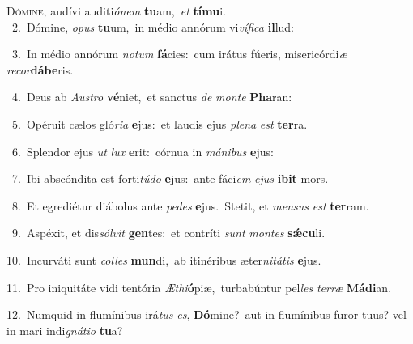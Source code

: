 \lettrine{\initial\textcolor{\initialcolor}{D}}{ómine,} audívi auditi\-\textit{ó}\-\textit{nem} \textbf{tu}\-am,~\star \textit{et} \textbf{tí}\-\textbf{mu}i.\\
{\numbfont\textcolor{\numbcolor}{~2.}}~Dómine, \textit{o}\-\textit{pus} \textbf{tu}\-um,~\star in médio annórum vi\-\textit{ví}\-\textit{fi}\textit{ca} \textbf{il}\-lud:\par
{\numbfont\textcolor{\numbcolor}{~3.}}~In médio annórum \textit{no}\-\textit{tum} \textbf{fá}\-cies:~\star cum irátus fúeris, misericórdi\textit{æ} \textit{re}\-\textit{cor}\textbf{dá}\textbf{be}ris.\par
{\numbfont\textcolor{\numbcolor}{~4.}}~Deus ab \textit{Aus}\-\textit{tro} \textbf{vé}\-niet,~\star et sanctus \textit{de} \textit{mon}\-\textit{te} \textbf{Pha}\-ran:\par
{\numbfont\textcolor{\numbcolor}{~5.}}~Opéruit cælos gló\-\textit{ri}\-\textit{a} \textbf{e}\-jus:~\star et laudis ejus \textit{ple}\-\textit{na} \textit{est} \textbf{ter}\-ra.\par
{\numbfont\textcolor{\numbcolor}{~6.}}~Splendor ejus \textit{ut} \textit{lux} \textbf{e}\-rit:~\star córnua in \textit{má}\-\textit{ni}\textit{bus} \textbf{e}\-jus:\par
{\numbfont\textcolor{\numbcolor}{~7.}}~Ibi abscóndita est forti\-\textit{tú}\-\textit{do} \textbf{e}\-jus:~\star ante fáci\textit{em} \textit{e}\-\textit{jus} \textbf{i}\-\textbf{bit} mors.\par
{\numbfont\textcolor{\numbcolor}{~8.}}~Et egrediétur diábolus ante \textit{pe}\-\textit{des} \textbf{e}\-jus.~\star Stetit, et \textit{men}\-\textit{sus} \textit{est} \textbf{ter}\-ram.\par
{\numbfont\textcolor{\numbcolor}{~9.}}~Aspéxit, et dis\-\textit{sól}\-\textit{vit} \textbf{gen}\-tes:~\star et contríti \textit{sunt} \textit{mon}\-\textit{tes} \textbf{sǽ}\-\textbf{cu}li.\par
{\numbfont\textcolor{\numbcolor}{10.}}~Incurváti sunt \textit{col}\-\textit{les} \textbf{mun}\-di,~\star ab itinéribus æter\-\textit{ni}\-\textit{tá}\textit{tis} \textbf{e}\-jus.\par
{\numbfont\textcolor{\numbcolor}{11.}}~Pro iniquitáte vidi tentória \textit{Æ}\-\textit{thi}\textbf{ó}piæ,~\star turbabúntur pel\textit{les} \textit{ter}\-\textit{ræ} \textbf{Má}\-\textbf{di}an.\par
{\numbfont\textcolor{\numbcolor}{12.}}~Numquid in flumínibus irá\textit{tus} \textit{es}\-, \textbf{Dó}\-mine?~\star aut in flumínibus furor tuus? vel in mari indi\-\textit{gná}\-\textit{ti}\textit{o} \textbf{tu}\-a?\par
